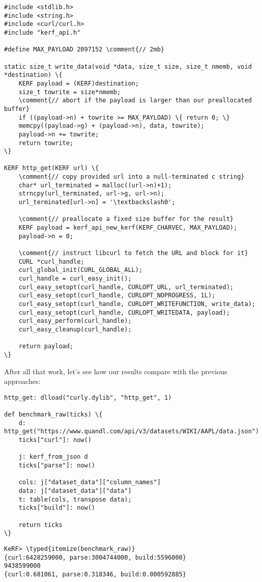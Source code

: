 \documentclass{article}
\newcommand{\typed}[1]{\textcolor{TealBlue}{#1}}
\newcommand{\comment}[1]{\textcolor{Orange}{#1}}
\begin{document}
\pagebreak
\begin{Verbatim}
#include <stdlib.h>
#include <string.h>
#include <curl/curl.h>
#include "kerf_api.h"

#define MAX_PAYLOAD 2097152 \comment{// 2mb}

static size_t write_data(void *data, size_t size, size_t nmemb, void *destination) \{
	KERF payload = (KERF)destination;
	size_t towrite = size*nmemb;
	\comment{// abort if the payload is larger than our preallocated buffer}
	if ((payload->n) + towrite >= MAX_PAYLOAD) \{ return 0; \}
	memcpy((payload->g) + (payload->n), data, towrite);
	payload->n += towrite;
	return towrite;
\}

KERF http_get(KERF url) \{
	\comment{// copy provided url into a null-terminated c string}
	char* url_terminated = malloc((url->n)+1);
	strncpy(url_terminated, url->g, url->n);
	url_terminated[url->n] = '\textbackslash0';

	\comment{// preallocate a fixed size buffer for the result}
	KERF payload = kerf_api_new_kerf(KERF_CHARVEC, MAX_PAYLOAD);
	payload->n = 0;
	
	\comment{// instruct libcurl to fetch the URL and block for it}
	CURL *curl_handle;
	curl_global_init(CURL_GLOBAL_ALL);
	curl_handle = curl_easy_init();
	curl_easy_setopt(curl_handle, CURLOPT_URL, url_terminated);
	curl_easy_setopt(curl_handle, CURLOPT_NOPROGRESS, 1L);
	curl_easy_setopt(curl_handle, CURLOPT_WRITEFUNCTION, write_data);
	curl_easy_setopt(curl_handle, CURLOPT_WRITEDATA, payload);
	curl_easy_perform(curl_handle);
	curl_easy_cleanup(curl_handle);

	return payload;
\}
\end{Verbatim}

\pagebreak
After all that work, let's see how our results compare with the previous approaches:

\begin{Verbatim}
http_get: dlload("curly.dylib", "http_get", 1)

def benchmark_raw(ticks) \{
	d: http_get("https://www.quandl.com/api/v3/datasets/WIKI/AAPL/data.json")
	ticks["curl"]: now()
	
	j: kerf_from_json d
	ticks["parse"]: now()
	
	cols: j["dataset_data"]["column_names"]
	data: j["dataset_data"]["data"]
	t: table(cols, transpose data);
	ticks["build"]: now()
	
	return ticks
\}
\end{Verbatim}
\begin{Verbatim}
KeRF> \typed{itemize(benchmark_raw)}
{curl:6428259000, parse:3004744000, build:5596000}
9438599000
{curl:0.681061, parse:0.318346, build:0.000592885}
\end{Verbatim}
\end{document}
